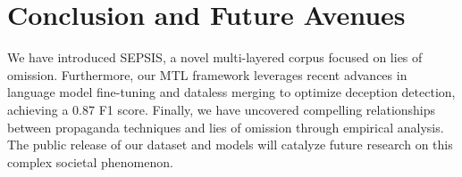 \vspace{-1mm}
\section{Conclusion and Future Avenues}
\vspace{-1mm}



We have introduced SEPSIS, a novel multi-layered corpus focused on lies of omission. Furthermore, our MTL framework leverages recent advances in language model fine-tuning and dataless merging to optimize deception detection, achieving a 0.87 F1 score. Finally, we have uncovered compelling relationships between propaganda techniques and lies of omission through empirical analysis. The public release of our dataset and models will catalyze future research on this complex societal phenomenon.
\begin{comment}
The paper's contribution can be summarized as follows: \emph{(i) this paper presents a pioneering study on the phenomenon of \ul{lies of omission}}. \emph{(ii) it introduces the SEPSIS corpus and associated resources}, \emph{(iii) the SEPSIS corpus (876,784 data points) incorporates four layers of annotation, including type, color, intention, and topic}, \emph{(iv) the paper introduces an MTL pipeline for SEPSIS classification}, \emph{(v) the MTL pipeline leverages the dataless merging of fine-tuned Language Models (LMs)}, \emph{(vi) it incorporates a tailored loss function specific to each layer, addressing different subproblems}, \emph{(vii) finally, the paper reveals a significant correlation between deception and propaganda techniques.}
\end{comment}


